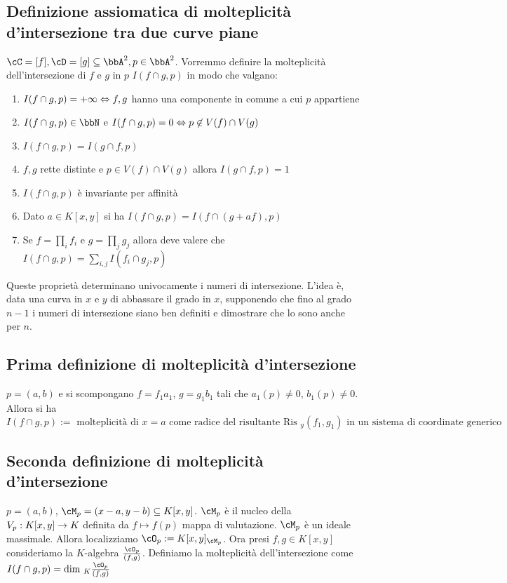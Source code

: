 \documentclass[a4paper,NoNotes,GeneralMath]{stdmdoc}
\begin{document}
	\subsection*{Definizione assiomatica di molteplicità d'intersezione tra due curve piane}
	$\cC = [f], \cD = [g] \subseteq \bbA^2, p \in \bbA^2$. Vorremmo definire la molteplicità dell'intersezione di $f$ e $g$ in $p$ $I(f \cap g, p)$ in modo che valgano:
	\begin{enumerate}
		\item $I(f \cap g, p) = +\infty \Leftrightarrow f,g$ hanno una componente in comune a cui $p$ appartiene
		\item $I(f \cap g, p) \in \bbN$ e $I(f \cap g, p) = 0 \Leftrightarrow p \not\in V(f) \cap V(g)$
		\item $I(f \cap g, p) = I(g \cap f, p)$
		\item $f, g$ rette distinte e $p \in V(f) \cap V(g)$ allora $I(g \cap f, p) = 1$
		\item $I(f \cap g, p)$ è invariante per affinità
		\item Dato $a \in K[x,y]$ si ha $I(f \cap g, p) = I(f \cap (g + af), p)$
		\item Se $f = \prod_i f_i$ e $g = \prod_j g_j$ allora deve valere che $I(f \cap g, p) = \sum_{i,j} I(f_i \cap g_j, p)$
	\end{enumerate}
	Queste proprietà determinano univocamente i numeri di intersezione. L'idea è, data una curva in $x$ e $y$ di abbassare il grado in $x$, supponendo che fino al grado $n-1$ i numeri di intersezione siano ben definiti e dimostrare che lo sono anche per $n$.
	
	\subsection*{Prima definizione di molteplicità d'intersezione}
	$p = (a,b)$ e si scompongano $f = f_1 a_1$, $g = g_1 b_1$ tali che $a_1 (p) \neq 0$, $b_1 (p) \neq 0$. Allora si ha $I(f \cap g, p) := \text{ molteplicità di } x = a \text{ come radice del risultante } \text{Ris }_y(f_1, g_1) \text{ in un sistema di coordinate generico }$
	
	\subsection*{Seconda definizione di molteplicità d'intersezione}
	$p = (a,b)$, $\cM_p = (x-a, y-b) \subseteq K[x,y]$. $\cM_p$ è il nucleo della $V_p: K[x,y] \rightarrow K$ definita da $f \mapsto f(p)$ mappa di valutazione. $\cM_p$ è un ideale massimale. Allora localizziamo $\cO_p := K[x,y]_{\cM_p}$. Ora presi $f, g \in K[x,y]$ consideriamo la $K$-algebra $\frac{\cO_p}{(f,g)}$. Definiamo la molteplicità dell'intersezione come $I(f\cap g, p) = \Dim_K \frac{\cO_p}{(f,g)}$
	
\end{document}
